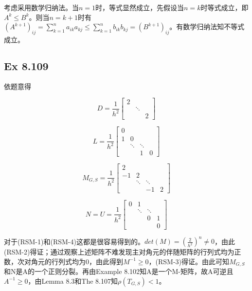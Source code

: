 \documentclass{article}
\begin{document}
\indent 考虑采用数学归纳法。当$n=1$时，等式显然成立，先假设当$n=k$时等式成立，即$A^{k}\le B^{k}$。则当$n=k+1$时有$(A^{k+1})_{ij}=\sum_{k=1}^{n}a_{ik}a_{kj}\le\sum_{k=1}^{n}b_{ik}b_{kj}=(B^{k+1})_{ij}$。有数学归纳法知不等式成立。

\subsection*{Ex 8.109}
\indent 依题意得

\begin{equation*}
D=\frac{1}{h^{2}}\left[
	\begin{array}{ccc}	
	2 & &  \\	
	& \ddots & \\	
	& & 2	
	\end{array}\right]
\end{equation*}

\begin{equation*}
L=\frac{1}{h^{2}}\left[
	\begin{array}{cccc}	
	0 & & & \\	
	1 & 0 & & \\	
	& \ddots & \ddots & \\
	& & 1 & 0	
	\end{array}\right]
\end{equation*}

\begin{equation*}
M_{G,S}=\frac{1}{h^{2}}\left[
	\begin{array}{cccc}	
	2 & & & \\	
	-1 & 2 & & \\	
	& \ddots & \ddots & \\
	& & -1 & 2	
	\end{array}\right]
\end{equation*}


\begin{equation*}
N=U=\frac{1}{h^{2}}\left[
	\begin{array}{cccc}	
	0 & 1 & & \\	
	& \ddots& \ddots& \\	
	&  & 0 & 1\\
	& &  & 0	
	\end{array}\right]
\end{equation*}

\indent 对于(RSM-1)和(RSM-4)这都是很容易得到的。$det(M)=(\frac{2}{h^{2}})^{n}\neq0$，由此(RSM-2)得证；通过观察上述矩阵不难发现主对角元的伴随矩阵的行列式均为正数，次对角元的行列式均为0，由此得到$M^{-1}\ge0$，(RSM-3)得证。由此可知$M_{G,S}$和N是A的一个正则分裂。再由Example 8.102知A是一个M-矩阵，故A可逆且$A^{-1}\ge0$，由Lemma 8.3和The 8.107知$\rho(T_{G,S})<1$。
\end{document}
